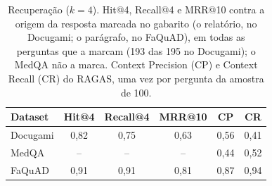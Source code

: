 \begin{table}[!t]
\centering
\footnotesize
\setlength{\tabcolsep}{3pt}
\caption{Recuperação ($k = 4$). Hit@4, Recall@4 e MRR@10 contra a origem da resposta marcada no gabarito (o relatório, no Docugami; o parágrafo, no FaQuAD), em todas as perguntas que a marcam (193 das 195 no Docugami); o MedQA não a marca. Context Precision (CP) e Context Recall (CR) do RAGAS, uma vez por pergunta da amostra de 100.}
\label{tab:recuperacao}
\begin{tabular}{lccccc}
\toprule
Dataset & Hit@4 & Recall@4 & MRR@10 & CP & CR \\
\midrule
Docugami & 0,82 & 0,75 & 0,63 & 0,56 & 0,41 \\
MedQA & -- & -- & -- & 0,44 & 0,52 \\
FaQuAD & 0,91 & 0,91 & 0,81 & 0,87 & 0,94 \\
\bottomrule
\end{tabular}
\end{table}
